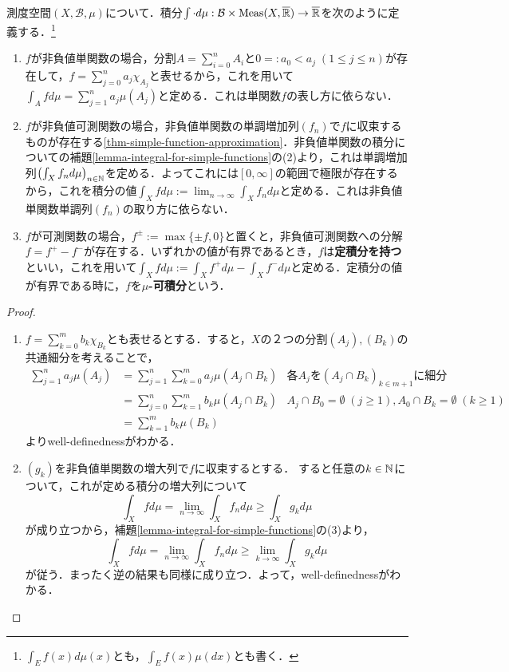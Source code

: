 \documentclass[uplatex, dvipdfmx]{jsreport}
\renewcommand{\B}{\mathcal{B}}
\begin{document}
\begin{definition}[integrable]
    測度空間$(X,\B,\mu)$について．積分$\int\cdot d\mu:\B\times\Meas(X,\o{\R})\to\o{\R}$を次のように定義する．\footnote{$\int_Ef(x)d\mu(x)$とも，$\int_Ef(x)\mu(dx)$とも書く．}
    \begin{enumerate}
        \item $f$が非負値単関数の場合，分割$A=\sum_{i=0}^nA_i$と$0=:a_0<a_j\;(1\le j\le n)$が存在して，$f=\sum_{j=0}^na_j\chi_{A_j}$と表せるから，これを用いて$\int_Afd\mu=\sum^n_{j=1}a_j\mu(A_j)$と定める．これは単関数$f$の表し方に依らない．
        \item $f$が非負値可測関数の場合，非負値単関数の単調増加列$(f_n)$で$f$に収束するものが存在する\ref{thm-simple-function-approximation}．非負値単関数の積分についての補題\ref{lemma-integral-for-simple-functions}の(2)より，これは単調増加列$\left(\int_Xf_nd\mu\right)_{n\in\mathbb{N}}$を定める．よってこれには$[0,\infty]$の範囲で極限が存在するから，これを積分の値$\int_Xfd\mu:=\lim_{n\to\infty}\int_Xf_nd\mu$と定める．これは非負値単関数単調列$(f_n)$の取り方に依らない．
        \item $f$が可測関数の場合，$f^{\pm}:=\max\{\pm f,0\}$と置くと，非負値可測関数への分解$f=f^+-f^-$が存在する．いずれかの値が有界であるとき，$f$は\textbf{定積分を持つ}といい，これを用いて$\int_Xfd\mu:=\int_Xf^+d\mu-\int_Xf^-d\mu$と定める．定積分の値が有界である時に，$f$を\textbf{$\mu$-可積分}という．
    \end{enumerate}
\end{definition}
\begin{proof}\mbox{}
    \begin{enumerate}
        \item $f=\sum^m_{k=0}b_k\chi_{B_k}$とも表せるとする．すると，$X$の２つの分割$(A_j),(B_k)$の共通細分を考えることで，
        \begin{align*}
            \sum^n_{j=1}a_j\mu(A_j)&=\sum^n_{j=1}\sum^m_{k=0}a_j\mu(A_j\cap B_k)&各A_jを(A_j\cap B_k)_{k\in m+1}に細分\\
            &=\sum^n_{j=0}\sum^m_{k=1}b_k\mu(A_j\cap B_k)&A_j\cap B_0=\emptyset\;(j\ge 1),A_0\cap B_k=\emptyset\;(k\ge 1)\\
            &=\sum^m_{k=1}b_k\mu(B_k)
        \end{align*}
        よりwell-definednessがわかる．
        \item $(g_k)$を非負値単関数の増大列で$f$に収束するとする．
        すると任意の$k\in\mathbb{N}$について，これが定める積分の増大列について
        \[\int_Xfd\mu=\lim_{n\to\infty}\int_Xf_nd\mu\ge\int_Xg_kd\mu\]
        が成り立つから，補題\ref{lemma-integral-for-simple-functions}の(3)より，
        \[\int_Xfd\mu=\lim_{n\to\infty}\int_Xf_nd\mu\ge\lim_{k\to\infty}\int_Xg_kd\mu\]
        が従う．まったく逆の結果も同様に成り立つ．よって，well-definednessがわかる．
    \end{enumerate}
\end{proof}
\end{document}

